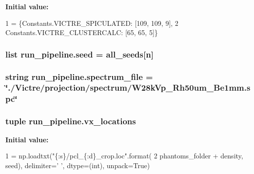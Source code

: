 {\bfseries Initial value\-:}
\begin{DoxyCode}
1 = \{Constants.VICTRE\_SPICULATED: [109, 109, 9],
2                  Constants.VICTRE\_CLUSTERCALC: [65, 65, 5]\}
\end{DoxyCode}
\hypertarget{namespacerun__pipeline_a0ea10c437dacefc9eb6e69b098f7124d}{
\subsubsection[{seed}]{\setlength{\rightskip}{0pt plus 5cm}list run\-\_\-pipeline.\-seed = {\bf all\-\_\-seeds}\mbox{[}n\mbox{]}}}\label{namespacerun__pipeline_a0ea10c437dacefc9eb6e69b098f7124d}
\hypertarget{namespacerun__pipeline_ab0c872cc0ac374f364881c1b8c53be2f}{
\subsubsection[{spectrum\-\_\-file}]{\setlength{\rightskip}{0pt plus 5cm}string run\-\_\-pipeline.\-spectrum\-\_\-file = \char`\"{}./Victre/projection/spectrum/W28k\-Vp\-\_\-\-Rh50um\-\_\-\-Be1mm.\-spc\char`\"{}}}\label{namespacerun__pipeline_ab0c872cc0ac374f364881c1b8c53be2f}
\hypertarget{namespacerun__pipeline_a6b679545160329ef5ae04905e0fc0f70}{
\subsubsection[{vx\-\_\-locations}]{\setlength{\rightskip}{0pt plus 5cm}tuple run\-\_\-pipeline.\-vx\-\_\-locations}}\label{namespacerun__pipeline_a6b679545160329ef5ae04905e0fc0f70}
{\bfseries Initial value\-:}
\begin{DoxyCode}
1 = np.loadtxt(\textcolor{stringliteral}{"\{:s\}/pcl\_\{:d\}\_crop.loc"}.format(
2         phantoms\_folder + density, seed), delimiter=\textcolor{stringliteral}{' '}, dtype=(int), unpack=\textcolor{keyword}{True})
\end{DoxyCode}
